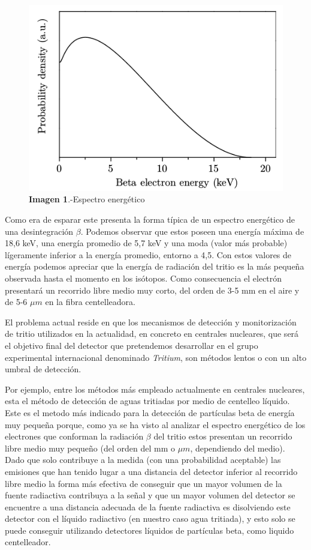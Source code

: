 \begin{figure}[hbtp]
\includegraphics[scale=0.4]{Espectro.png}
\centering
\caption{\textbf{Imagen 1}.-Espectro energético}
\end{figure}

Como era de esparar este presenta la forma típica de un espectro energético de una desintegración $\beta$. Podemos observar que estos poseen una energía máxima de 18,6 keV, una energía promedio de 5,7 keV y una moda (valor más probable) lígeramente inferior a la energía promedio, entorno a 4,5. Con estos valores de energía podemos apreciar que la energía de radiación del tritio es la más pequeña observada hasta el momento en los isótopos. Como consecuencia el electrón presentará un recorrido libre medio muy corto, del orden de 3-5 mm en el aire y de 5-6 $\mu m$ en la fibra centelleadora.

El problema actual reside en que los mecanismos de detección y monitorización de tritio utilizados en la actualidad, en concreto en centrales nucleares, que será el objetivo final del detector que pretendemos desarrollar en el grupo experimental internacional denominado \textit{Tritium}, son métodos lentos o con un alto umbral de detección. 

Por ejemplo, entre los métodos más empleado actualmente en centrales nucleares, esta el método de detección de aguas tritiadas por medio de centelleo líquido. Este es el metodo más indicado para la detección de partículas beta de energía muy pequeña porque, como ya se ha visto al analizar el espectro energético de los electrones que conforman la radiación $\beta$ del tritio estos presentan un recorrido libre medio muy pequeño (del orden del mm o $\mu m$, dependiendo del medio). Dado que solo contribuye a la medida (con una probabilidad aceptable) las emisiones que han tenido lugar a una distancia del detector inferior al recorrido libre medio la forma más efectiva de conseguir que un mayor volumen de la fuente radiactiva contribuya a la señal y que un mayor volumen del detector se encuentre a una distancia adecuada de la fuente radiactiva es disolviendo este detector con el líquido radiactivo (en nuestro caso agua tritiada), y esto solo se puede conseguir utilizando detectores líquidos de partículas beta, como liquido centelleador. 

